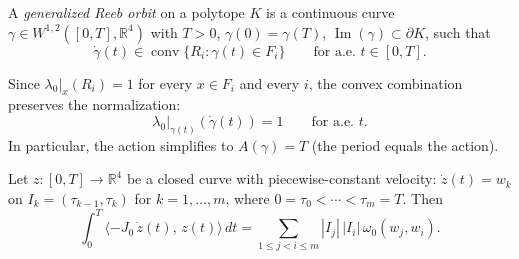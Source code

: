 \begin{definition}\label{def:reeb-orbit-polytope}
A \emph{generalized Reeb orbit} on a polytope $K$ is a continuous curve
$\gamma \in W^{1,2}([0, T], \mathbb{R}^4)$ with $T > 0$,
$\gamma(0) = \gamma(T)$, $\operatorname{Im}(\gamma) \subset \partial K$,
such that
\[
  \dot{\gamma}(t) \in \operatorname{conv}\{ R_i : \gamma(t) \in F_i \}
  \qquad \text{for a.e.\ } t \in [0, T].
\]
\end{definition}

\begin{remark}\label{rem:contact-normalization}
Since $\lambda_0|_x(R_i) = 1$ for every $x \in F_i$ and every
$i$, the convex combination preserves the normalization:
\[
  \lambda_0|_{\gamma(t)}(\dot{\gamma}(t)) = 1
  \qquad \text{for a.e.\ } t.
\]
In particular, the action simplifies to $A(\gamma) = T$
(the period equals the action).
\end{remark}

\begin{lemma}\label{lem:shoelace}
Let $z \colon [0, T] \to \mathbb{R}^4$ be a closed curve with
piecewise-constant velocity:
$\dot{z}(t) = w_k$ on $I_k = (\tau_{k-1}, \tau_k)$ for
$k = 1, \ldots, m$, where $0 = \tau_0 < \cdots < \tau_m = T$.
Then
\begin{equation}\label{eq:shoelace}
  \int_0^T \langle -J_0\, \dot{z}(t),\, z(t) \rangle \, dt
  = \sum_{1 \leq j < i \leq m}
    |I_j|\, |I_i|\, \omega_0(w_j, w_i).
\end{equation}
\end{lemma}

